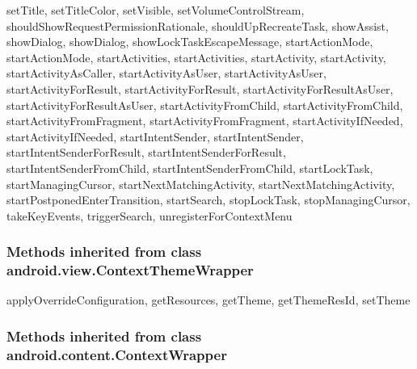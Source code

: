 setTitle, setTitleColor, setVisible, setVolumeControlStream, shouldShowRequestPermissionRationale, shouldUpRecreateTask, showAssist, showDialog, showDialog, showLockTaskEscapeMessage, startActionMode, startActionMode, startActivities, startActivities, startActivity, startActivity, startActivityAsCaller, startActivityAsUser, startActivityAsUser, startActivityForResult, startActivityForResult, startActivityForResultAsUser, startActivityForResultAsUser, startActivityFromChild, startActivityFromChild, startActivityFromFragment, startActivityFromFragment, startActivityIfNeeded, startActivityIfNeeded, startIntentSender, startIntentSender, startIntentSenderForResult, startIntentSenderForResult, startIntentSenderFromChild, startIntentSenderFromChild, startLockTask, startManagingCursor, startNextMatchingActivity, startNextMatchingActivity, startPostponedEnterTransition, startSearch, stopLockTask, stopManagingCursor, takeKeyEvents, triggerSearch, unregisterForContextMenu\\

\subsubsection{Methods inherited from class android.view.ContextThemeWrapper}

applyOverrideConfiguration, getResources, getTheme, getThemeResId, setTheme\\

\subsubsection{Methods inherited from class android.content.ContextWrapper}

